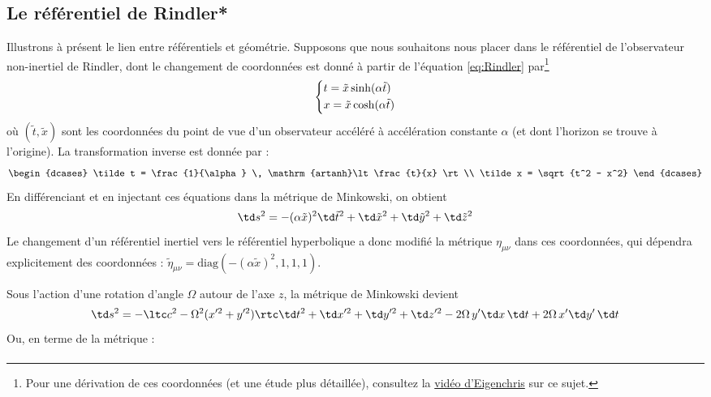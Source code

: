 {\subsection{Le référentiel de Rindler*}
Illustrons à présent le lien entre référentiels et géométrie. Supposons que nous souhaitons nous placer dans le référentiel de l'observateur non-inertiel de Rindler, dont le changement de coordonnées est donné à partir de l'équation \ref{eq:Rindler} par\footnote{Pour une dérivation de ces coordonnées (et une étude plus détaillée), consultez la \href{https://youtu.be/O92pQXZaEnw}{vidéo d'Eigenchris} sur ce sujet.}
\begin{align}
    \begin{dcases}
        t = \tilde x \sinh (\alpha \tilde t) \\
        x = \tilde x \cosh (\alpha \tilde t)
    \end{dcases}
\end{align}
où $(\tilde t, \tilde x)$ sont les coordonnées du point de vue d'un observateur accéléré à accélération constante $\alpha$ (et dont l'horizon se trouve à l'origine). La transformation inverse est donnée par :
\begin{align}
    \begin{dcases}
        \tilde t = \frac{1}{\alpha} \, \mathrm{artanh}\lt \frac{t}{x} \rt \\
        \tilde x = \sqrt{t^2 - x^2}
    \end{dcases}
\end{align}
En différenciant et en injectant ces équations dans la métrique de Minkowski, on obtient
\begin{equation}
    \td s^2 = - (\alpha \tilde x)^2 \td \tilde t^2 + \td \tilde x^2 + \td \tilde y^2 + \td \tilde z^2
\end{equation}
Le changement d'un référentiel inertiel vers le référentiel hyperbolique a donc modifié la métrique $\eta_{\mu\nu}$ dans ces coordonnées, qui dépendra explicitement des coordonnées : $\tilde \eta_{\mu\nu} = \mathrm{diag} (-(\alpha \tilde x)^2, 1, 1,1)$.
\begin{exmp}
    Sous l'action d'une rotation d'angle $\Omega$ autour de l'axe $z$, la métrique de Minkowski devient
    \begin{equation}
        \td s^2 = -\ltc c^2 - \Omega^2 (x'^2 + y'^2) \rtc \td t^2 + \td x'^2 +\td y'^2 + \td z'^2 - 2\Omega \,y' \td x \, \td t + 2\Omega\, x' \td y'\, \td t
    \end{equation}
    Ou, en terme de la métrique :
    \begin{align}

\end{align}
\end{exmp}}
